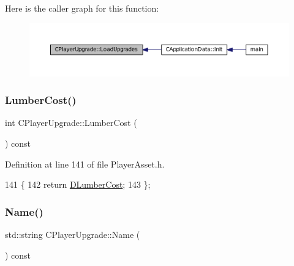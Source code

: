 Here is the caller graph for this function\+:\nopagebreak
\begin{figure}[H]
\begin{center}
\leavevmode
\includegraphics[width=350pt]{classCPlayerUpgrade_a9bef3d3f2866cd555a9b175426e953d6_icgraph}
\end{center}
\end{figure}
\hypertarget{classCPlayerUpgrade_ac7ecd3365fd8b9b54fb38df815f31877}{}\label{classCPlayerUpgrade_ac7ecd3365fd8b9b54fb38df815f31877} 
\subsubsection{\texorpdfstring{Lumber\+Cost()}{LumberCost()}}
{\footnotesize\ttfamily int C\+Player\+Upgrade\+::\+Lumber\+Cost (\begin{DoxyParamCaption}{ }\end{DoxyParamCaption}) const\hspace{0.3cm}{\ttfamily [inline]}}



Definition at line 141 of file Player\+Asset.\+h.


\begin{DoxyCode}
141                               \{
142             \textcolor{keywordflow}{return} \hyperlink{classCPlayerUpgrade_a3c671aceeaeec746fc5ab3c9de28194b}{DLumberCost};  
143         \};
\end{DoxyCode}
\hypertarget{classCPlayerUpgrade_a9030c62bc29150957f2fb6485ee9c01f}{}\label{classCPlayerUpgrade_a9030c62bc29150957f2fb6485ee9c01f} 
\subsubsection{\texorpdfstring{Name()}{Name()}}
{\footnotesize\ttfamily std\+::string C\+Player\+Upgrade\+::\+Name (\begin{DoxyParamCaption}{ }\end{DoxyParamCaption}) const\hspace{0.3cm}{\ttfamily [inline]}}



